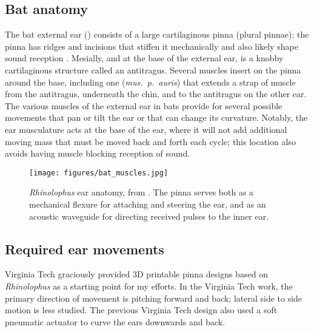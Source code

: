 \documentclass{article}
\begin{document}
\subsection{Bat anatomy}
The bat external ear () consists of a large cartilaginous pinna (plural pinnae); the pinna has ridges and incisions that stiffen it mechanically and also likely shape sound reception \citep{heine2004anatomy, pannala2013investigation, pannala2013interplay, schouten2019principles}. Mesially, and at the base of the external ear, is a knobby cartilaginous structure called an antitragus. Several muscles insert on the pinna around the base, including one (\emph{mus.~p.~auris}) that extends a strap of muscle from the antitragus, underneath the chin, and to the antitragus on the other ear. The various muscles of the external ear in bats provide for several possible movements that pan or tilt the ear or that can change its curvature. Notably, the ear musculature acts at the base of the ear, where it will not add additional moving mass that must be moved back and forth each cycle; this location also avoids having muscle blocking reception of sound. 
\begin{figure}[h]
\begin{center}
\texttt{[image: figures/bat\_muscles.jpg]}
\end{center}
\caption{\emph{Rhinolophus} ear anatomy, from \citep{pannala2013investigation}. The pinna serves both as a mechanical flexure for attaching and steering the ear, and as an acoustic waveguide for directing received pulses to the inner ear.}
\label{fig:1}
\end{figure}

\subsection{Required ear movements}
Virginia Tech graciously provided 3D printable pinna designs based on \emph{Rhinolophus} as a starting point for my efforts. In the Virginia Tech work, the primary direction of movement is pitching forward and back; lateral side to side motion is less studied. The previous Virginia Tech design also used a soft pneumatic actuator to curve the ears downwards and back.%
\end{document}
